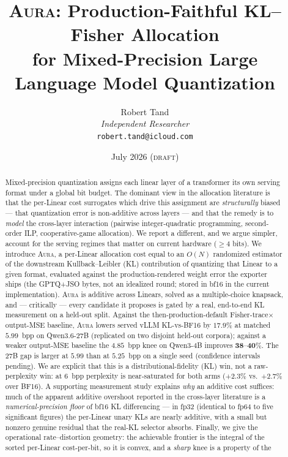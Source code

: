 \documentclass[11pt]{article}
\title{\bfseries \textsc{Aura}: Production-Faithful KL--Fisher Allocation\\
       for Mixed-Precision Large Language Model Quantization}
\author{Robert Tand\\
        \textit{Independent Researcher}\\
        \texttt{robert.tand@icloud.com}}
\date{July 2026 \quad\textsc{(draft)}}
\theoremstyle{plain}
\theoremstyle{definition}
\begin{document}
\maketitle

\begin{abstract}
Mixed-precision quantization assigns each linear layer of a transformer its own
serving format under a global bit budget. The dominant view in the allocation
literature is that the per-Linear cost surrogates which drive this assignment are
\emph{structurally} biased --- that quantization error is non-additive across
layers --- and that the remedy is to \emph{model} the cross-layer interaction
(pairwise integer-quadratic programming, second-order ILP, cooperative-game
allocation). We report a different, and we argue simpler, account for the
serving regimes that matter on current hardware ($\ge 4$ bits). We introduce
\textsc{Aura}, a per-Linear allocation cost equal to an $O(N)$ randomized
estimator of the downstream Kullback--Leibler (KL) contribution of quantizing
that Linear to a given format, evaluated against the production-rendered weight
error the exporter ships (the GPTQ+JSO bytes, not an idealized round; stored in
bf16 in the current implementation). \textsc{Aura} is additive across Linears,
solved as a multiple-choice knapsack, and --- critically --- every candidate it
proposes is gated by a real, end-to-end KL measurement on a held-out split.
Against the then-production-default Fisher-trace$\times$output-MSE baseline,
\textsc{Aura} lowers served vLLM KL-vs-BF16 by $\mathbf{17.9\%}$ at matched
$5.99$~bpp on Qwen3.6-27B (replicated on two disjoint held-out corpora); against a
weaker output-MSE baseline the $4.85$~bpp knee on Qwen3-4B improves
$\mathbf{38\text{--}40\%}$. The 27B gap is larger at $5.99$ than at $5.25$~bpp on a
single seed (confidence intervals pending). We are explicit
that this is a distributional-fidelity (KL) win, not a raw-perplexity win: at
$6$~bpp perplexity is near-saturated for both arms ($+2.3\%$ vs.\ $+2.7\%$ over
BF16). A supporting measurement study explains \emph{why} an additive cost
suffices: much of the apparent additive overshoot reported in the cross-layer
literature is a \emph{numerical-precision floor} of bf16 KL differencing --- in
fp32 (identical to fp64 to five significant figures) the per-Linear unary KLs
are nearly additive, with a small but nonzero genuine residual that the
real-KL selector absorbs. Finally, we give the operational rate--distortion
geometry: the achievable frontier is the integral of the sorted per-Linear
cost-per-bit, so it is convex, and a \emph{sharp} knee is a property of the

\end{abstract}
\end{document}
